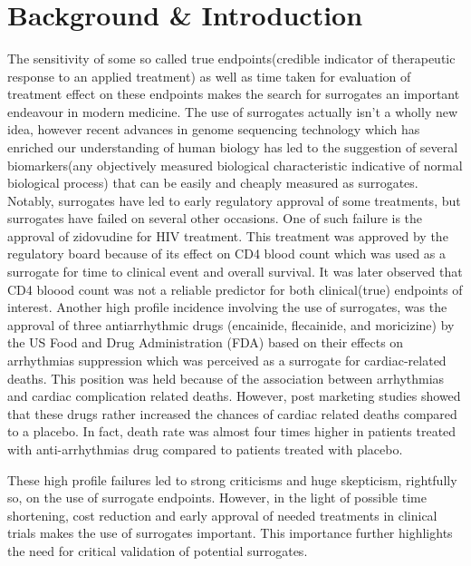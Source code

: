 \documentclass[a4paper,12pt]{article}\usepackage[]{graphicx}\usepackage[]{color}
\title{
\begin{flushleft} 
\Huge {\color{black!90}{\fontfamily{phv}\selectfont 2016\textbullet2017 \\   Faculty of Sciences \\ \large\textit{Master of Statistics} \\ \vspace{1.0in} Master's Thesis \\ Evaluation of Surrogate Endpoints in Human Microbiome \\ \vspace{1.0in} \large Supervisor:\\Prof. dr. Shekdy Ziv \\ \vspace{0.5in} Supervisor:\\ Dr. Van Der Elst, Wim \\ \vspace{1.0in}\Large Olusoji Oluwafemi Daniel\\ \large \textit{Thesis presented in fulfillment of the requirements for the degree of Master of
Statistics}}}
\end{flushleft}
}
\date{}
\begin{document}
\maketitle
\newpage

\tableofcontents

\newpage

\section{Background \& Introduction}
The sensitivity of some so called true endpoints(credible indicator of therapeutic response to an applied treatment\citep{buyseM}) as well as time taken for evaluation of treatment effect on these endpoints makes the search for surrogates an important endeavour in modern medicine\citep{surrogate2}. The use of surrogates actually isn't a wholly new idea\citep{CAST,fleming1}, however recent advances in genome sequencing technology which has enriched our understanding of human biology has led to the suggestion of several biomarkers(any objectively measured biological characteristic indicative of normal biological process\citep{buyseM}) that can be easily and cheaply measured as surrogates\citep{buyseM}. Notably, surrogates have led to early regulatory approval of some treatments\citep{buyseM2,buyseM3}, but surrogates have failed on several other occasions\citep{buyseM,fleming1,fleming2}. One of such failure is the approval of zidovudine for HIV treatment. This treatment was approved by the regulatory board because of its effect on CD4 blood count which was used as a surrogate for time to clinical event and overall survival\citep{lagakos}. It was later observed that CD4 bloood count was not a reliable predictor for both clinical(true) endpoints of interest\citep{Degruttola}. Another high profile incidence involving the use of surrogates, was the approval of three antiarrhythmic drugs (encainide, flecainide, and moricizine) by the US Food and Drug Administration (FDA) based on their effects on arrhythmias suppression which was perceived as a surrogate for cardiac-related deaths\citep{buyseM}. This position was held because of the association between arrhythmias and cardiac complication related deaths. However, post marketing studies showed that these drugs rather increased the chances of cardiac related deaths compared to a placebo. In fact, death rate was almost four times higher in patients treated with anti-arrhythmias drug compared to patients treated with placebo\citep{Degruttola2}.

These high profile failures led to strong criticisms and huge skepticism, rightfully so, on the use of surrogate endpoints\citep{buyseM}. However, in the light of  possible time shortening, cost reduction and early approval of needed treatments in clinical trials makes the use of surrogates important\citep{buyseM,surrogate2,surrogate3}. This importance further highlights the need for critical validation of potential surrogates.
\end{document}
